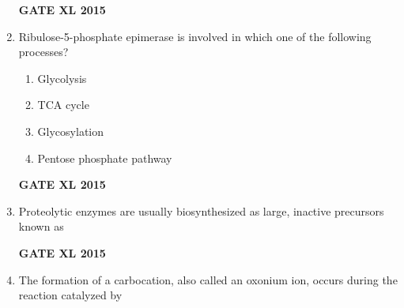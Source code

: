 \documentclass[journal,12pt,onecolumn]{IEEEtran}
\begin{document}
\begin{enumerate}
\begin{enumerate}
    \end{enumerate}
\begin{flushright}\textbf{GATE XL 2015}\end{flushright}
\item Ribulose-5-phosphate epimerase is involved in which one of the following processes?
    \begin{enumerate}
            \item Glycolysis
	    \item TCA cycle
	    \item Glycosylation
            \item Pentose phosphate pathway
    \end{enumerate}
\begin{flushright}\textbf{GATE XL 2015}\end{flushright}
\item Proteolytic enzymes are usually biosynthesized as large, inactive precursors known as
    \begin{enumerate}
    \end{enumerate}
\begin{flushright}\textbf{GATE XL 2015}\end{flushright}
\item The formation of a carbocation, also called an oxonium ion, occurs during the reaction catalyzed by
    \begin{enumerate}
\end{enumerate}
\end{enumerate}
\end{document}
